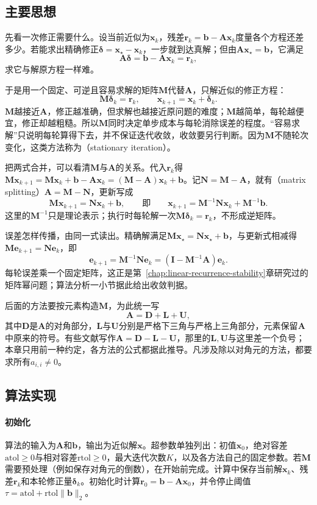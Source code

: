 \subsection{主要思想}

先看一次修正需要什么。设当前近似为$\bm x_k$，残差$\bm r_k=\bm b-\bm A\bm x_k$度量各个方程还差多少。若能求出精确修正$\bm\delta=\bm x_\star-\bm x_k$，一步就到达真解；但由$\bm A\bm x_\star=\bm b$，它满足
\[
\bm A\bm\delta=\bm b-\bm A\bm x_k=\bm r_k ,
\]
求它与解原方程一样难。

于是用一个固定、可逆且容易求解的矩阵$\bm M$代替$\bm A$，只解近似的修正方程：
\[
\bm M\bm\delta_k=\bm r_k,\qquad \bm x_{k+1}=\bm x_k+\bm\delta_k .
\]
$\bm M$越接近$\bm A$，修正越准确，但求解也越接近原问题的难度；$\bm M$越简单，每轮越便宜，修正却越粗糙。所以$\bm M$同时决定单步成本与每轮消除误差的程度。“容易求解”只说明每轮算得下去，并不保证迭代收敛，收敛要另行判断。因为$\bm M$不随轮次变化，这类方法称为（stationary iteration）。

把两式合并，可以看清$\bm M$与$\bm A$的关系。代入$\bm r_k$得$\bm M\bm x_{k+1}=\bm M\bm x_k+\bm b-\bm A\bm x_k=(\bm M-\bm A)\bm x_k+\bm b$。记$\bm N=\bm M-\bm A$，就有（matrix splitting）$\bm A=\bm M-\bm N$，更新写成
\[
\bm M\bm x_{k+1}=\bm N\bm x_k+\bm b,\qquad\text{即}\qquad
\bm x_{k+1}=\bm M^{-1}\bm N\bm x_k+\bm M^{-1}\bm b .
\]
这里的$\bm M^{-1}$只是理论表示；执行时每轮解一次$\bm M\bm\delta_k=\bm r_k$，不形成逆矩阵。

误差怎样传播，由同一式读出。精确解满足$\bm M\bm x_\star=\bm N\bm x_\star+\bm b$，与更新式相减得$\bm M\bm e_{k+1}=\bm N\bm e_k$，即
\[
\bm e_{k+1}=\bm M^{-1}\bm N\bm e_k=(\bm I-\bm M^{-1}\bm A)\bm e_k .
\]
每轮误差乘一个固定矩阵，这正是第~\ref{chap:linear-recurrence-stability}章研究过的矩阵幂问题；算法分析一小节据此给出收敛判据。

后面的方法要按元素构造$\bm M$，为此统一写
\[
\bm A=\bm D+\bm L+\bm U ,
\]
其中$\bm D$是$\bm A$的对角部分，$\bm L$与$\bm U$分别是严格下三角与严格上三角部分，元素保留$\bm A$中原来的符号。有些文献写作$\bm A=\bm D-\bm L-\bm U$，那里的$\bm L,\bm U$与这里差一个负号；本章只用前一种约定，各方法的公式都据此推导。凡涉及除以对角元的方法，都要求所有$a_{i,i}\neq0$。

\subsection{算法实现}

\paragraph{初始化}
算法的输入为$\bm A$和$\bm b$，输出为近似解$\bm x$。超参数单独列出：初值$\bm x_0$，绝对容差$\mathrm{atol}\geq0$与相对容差$\mathrm{rtol}\geq0$，最大迭代次数$K$，以及各方法自己的固定参数。若$\bm M$需要预处理（例如保存对角元的倒数），在开始前完成。计算中保存当前解$\bm x_k$、残差$\bm r_k$和本轮修正量$\bm\delta_k$。初始化时计算$\bm r_0=\bm b-\bm A\bm x_0$，并令停止阈值$\tau=\mathrm{atol}+\mathrm{rtol}\lVert\bm b\rVert_2$。


